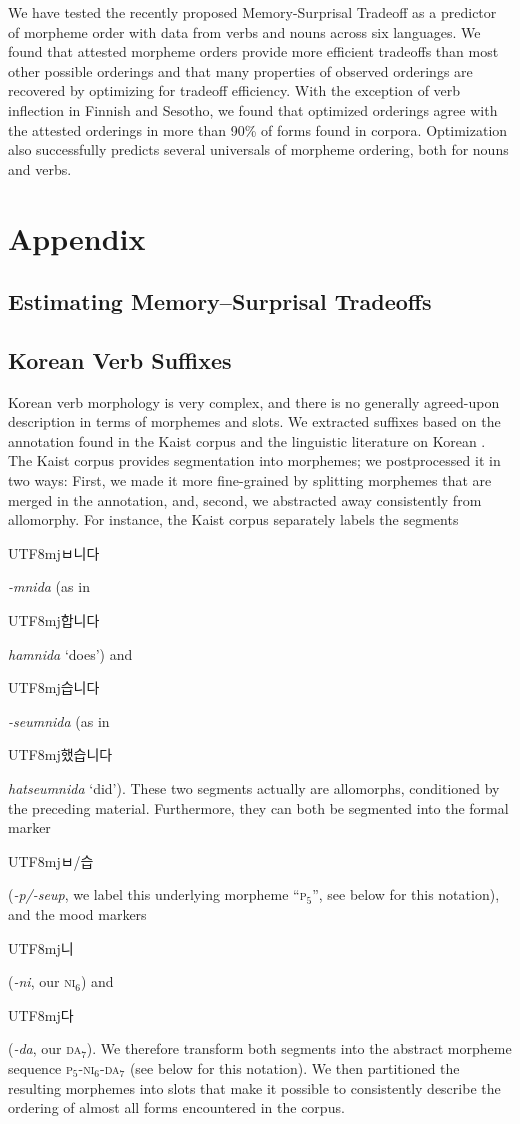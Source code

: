 \documentclass[11pt,letterpaper]{article}
\newcommand{\korean}[1]{\begin{CJK}{UTF8}{mj}#1\end{CJK}}
\begin{document}
We have tested the recently proposed Memory-Surprisal Tradeoff as a predictor of morpheme order with data from verbs and nouns across six languages.
We found that attested morpheme orders provide more efficient tradeoffs than most other possible orderings and that many properties of observed orderings are recovered by optimizing for tradeoff efficiency.
With the exception of verb inflection in Finnish and Sesotho, we found that optimized orderings agree with the attested orderings in more than 90\% of forms found in corpora.
Optimization also successfully predicts several universals of morpheme ordering, both for nouns and verbs.




\appendix

\section{Appendix}

\tableofcontents

\subsection{Estimating Memory--Surprisal Tradeoffs}


\subsection{Korean Verb Suffixes}

Korean verb morphology is very complex, and there is no generally agreed-upon description in terms of morphemes and slots.
We extracted suffixes based on the annotation found in the Kaist corpus and the linguistic literature on Korean \citep{yeon2010korean}.
The Kaist corpus provides segmentation into morphemes; we postprocessed it in two ways:
First, we made it more fine-grained by splitting morphemes that are merged in the annotation, and, second, we abstracted away consistently from allomorphy.
For instance, the Kaist corpus separately labels the segments \korean{ㅂ니다} \textit{-mnida} (as in \korean{합니다} \textit{hamnida} `does') and \korean{습니다} \textit{-seumnida} (as in \korean{했습니다} \textit{hatseumnida} `did').
These two segments actually are allomorphs, conditioned by the preceding material.
Furthermore, they can both be segmented into the formal marker \korean{ㅂ/습} (\textit{-p/-seup}, we label this underlying morpheme ``\textsc{p}$_5$'', see below for this notation), and the mood markers \korean{니} (\textit{-ni}, our \textsc{ni}$_6$) and \korean{다} (\textit{-da}, our \textsc{da}$_7$).
We therefore transform both segments into the abstract morpheme sequence \textsc{p}$_5$-\textsc{ni}$_6$-\textsc{da}$_7$ (see below for this notation).
We then partitioned the resulting morphemes into slots that make it possible to consistently describe the ordering of almost all forms encountered in the corpus.
\end{document}
